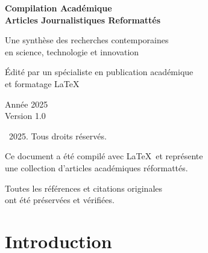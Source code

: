 \documentclass[12pt,a4paper,twoside,openright,openany]{book}
\begin{document}
	
	\begin{titlepage}
		\centering
		\vspace*{\fill}
		
		{\fontsize{24}{30}\selectfont\bfseries
			Compilation Académique\\
			Articles Journalistiques Reformattés
		}
		
		\vspace{2cm}
		
		{\large
			Une synthèse des recherches contemporaines\\
			en science, technologie et innovation
		}
		
		\vspace{3cm}
		
		{\normalsize
			Édité par un spécialiste en publication académique\\
			et formatage LaTeX
		}
		
		\vspace{\fill}
		
		{\normalsize
			Année 2025\\
			Version 1.0
		}
		
		\vspace{0.5cm}
	\end{titlepage}
	
	\newpage
	\thispagestyle{empty}
	\vspace*{\fill}
	\begin{center}
		\small
		\textcopyright\ 2025. Tous droits réservés.\\
		
		\vspace{1cm}
		
		Ce document a été compilé avec \LaTeX\ et représente\\
		une collection d'articles académiques réformattés.\\
		
		\vspace{1cm}
		
		Toutes les références et citations originales\\
		ont été préservées et vérifiées.
	\end{center}
	\vspace*{\fill}
	
	\newpage
	\tableofcontents
	\newpage
	
	\chapter*{Introduction}
	
\end{document}
